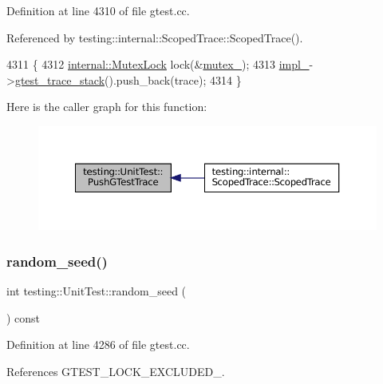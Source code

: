 Definition at line 4310 of file gtest.\+cc.



Referenced by testing\+::internal\+::\+Scoped\+Trace\+::\+Scoped\+Trace().


\begin{DoxyCode}
4311                                  \{
4312   \hyperlink{namespacetesting_1_1internal_a08b187c6cc4e28400aadf9a32fccc8de}{internal::MutexLock} lock(&\hyperlink{classtesting_1_1UnitTest_abb94ef45cf0ab43be81ac6d5b1364132}{mutex\_});
4313   \hyperlink{classtesting_1_1UnitTest_a834685f92009d21b21a7307f4cbfb6e5}{impl\_}->\hyperlink{classtesting_1_1internal_1_1UnitTestImpl_af8c7c0a0c954e36d83e6e4690d3fb938}{gtest\_trace\_stack}().push\_back(trace);
4314 \}
\end{DoxyCode}
Here is the caller graph for this function\+:
\nopagebreak
\begin{figure}[H]
\begin{center}
\leavevmode
\includegraphics[width=350pt]{classtesting_1_1UnitTest_af455b953108ff09b3b6e41011653e78a_icgraph}
\end{center}
\end{figure}
\mbox{\label{classtesting_1_1UnitTest_adddc090a06f2d3a0e68f3762ee262688}} 
\subsubsection{\texorpdfstring{random\+\_\+seed()}{random\_seed()}}
{\footnotesize\ttfamily int testing\+::\+Unit\+Test\+::random\+\_\+seed (\begin{DoxyParamCaption}{ }\end{DoxyParamCaption}) const}



Definition at line 4286 of file gtest.\+cc.



References G\+T\+E\+S\+T\+\_\+\+L\+O\+C\+K\+\_\+\+E\+X\+C\+L\+U\+D\+E\+D\+\_\+.




